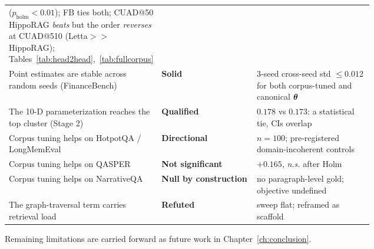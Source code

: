 \begin{table}[t]
\begin{tabular}{p{0.40\linewidth} l p{0.32\linewidth}}
($p_{\mathrm{holm}}{<}0.01$); FB ties both; CUAD@50 HippoRAG \emph{beats} \Vt{}
but the order \emph{reverses} at CUAD@510 (Letta$>$\Vt{}$>$HippoRAG);
Tables~\ref{tab:head2head},~\ref{tab:fullcorpus} \\
Point estimates are stable across random seeds (FinanceBench) &
\textbf{Solid} & 3-seed cross-seed std $\le 0.012$ for both corpus-tuned and
canonical $\boldsymbol{\theta}$ \\
The 10-D parameterization reaches the top cluster (Stage 2) &
\textbf{Qualified} & $0.178$ vs $0.173$: a statistical tie, CIs overlap \\
Corpus tuning helps on HotpotQA / LongMemEval &
\textbf{Directional} & $n{=}100$; pre-registered domain-incoherent controls \\
Corpus tuning helps on QASPER & \textbf{Not significant} & $+0.165$,
\emph{n.s.} after Holm \\
Corpus tuning helps on NarrativeQA & \textbf{Null by construction} & no
paragraph-level gold; objective undefined \\
The graph-traversal term carries retrieval load & \textbf{Refuted} &
\wgraph{} sweep flat; reframed as scaffold \\
\bottomrule
\end{tabular}
\end{table}

Remaining limitations are carried forward as future work in
Chapter~\ref{ch:conclusion}.

